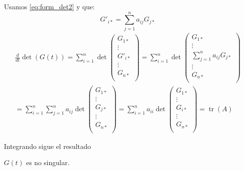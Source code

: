 \begin{demo} Usamos \eqref{eq:form_det2} y que:
$$
G'_{i *}=\sum_{j=1}^{n} a_{i j} G_{j *}
$$
\begin{multline*}
 \frac{d}{dt}\det \left(G(t)\right)= 
 \sum_{i=1}^n\det 
    \begin{pmatrix}
            G_{1*}\\
            \vdots\\
            G'_{i*}\\
            \vdots\\
            G_{n*}\\
   \end{pmatrix}
 = 
  \sum_{i=1}^n\det 
    \begin{pmatrix}
            G_{1*}\\
            \vdots\\
            \sum_{j=1}^na_{ij}G_{j*}\\
            \vdots\\
            G_{n*}\\
   \end{pmatrix}\\
    =\sum_{i=1}^n\sum_{j=1}^na_{ij}\det 
    \begin{pmatrix}
            G_{1*}\\
            \vdots\\
            G_{j*}\\
            \vdots\\
            G_{n*}\\
   \end{pmatrix}
      =\sum_{i=1}^n a_{ii}\det 
    \begin{pmatrix}
            G_{1*}\\
            \vdots\\
            G_{i*}\\
            \vdots\\
            G_{n*}\\
   \end{pmatrix}=\operatorname{tr}(A)
 \end{multline*}

 Integrando sigue el resultado
\end{demo}

\begin{corolario}{}
  $G(t)$ es no singular.
\end{corolario}


